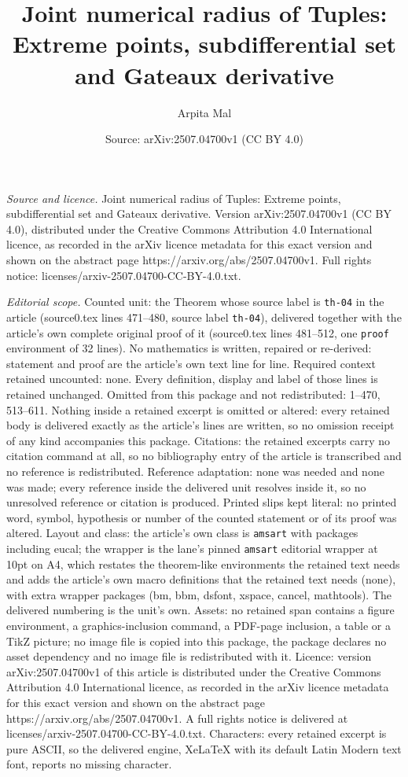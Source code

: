 \documentclass[10pt,a4paper]{amsart}
\title[Joint numerical radius of Tuples: Extreme points, subdiffere]{Joint numerical radius of Tuples: Extreme points, subdifferential set and Gateaux derivative}
\author{Arpita Mal}
\date{Source: arXiv:2507.04700v1 (CC BY 4.0)}
\begin{document}
\maketitle

\noindent\emph{Source and licence.} Joint numerical radius of Tuples: Extreme points, subdifferential set and Gateaux derivative. Version arXiv:2507.04700v1 (CC BY 4.0), distributed under the Creative Commons Attribution 4.0 International licence, as recorded in the arXiv licence metadata for this exact version and shown on the abstract page https://arxiv.org/abs/2507.04700v1. Full rights notice: licenses/arxiv-2507.04700-CC-BY-4.0.txt.\par\smallskip

\noindent\textit{Editorial scope.} Counted unit: the Theorem whose source label is \texttt{th-04} in the article (source0.tex lines 471--480, source label \texttt{th-04}), delivered together with the article's own complete original proof of it (source0.tex lines 481--512, one \texttt{proof} environment of 32 lines). No mathematics is written, repaired or re-derived: statement and proof are the article's own text line for line. Required context retained uncounted: none. Every definition, display and label of those lines is retained unchanged. Omitted from this package and not redistributed: 1--470, 513--611. Nothing inside a retained excerpt is omitted or altered: every retained body is delivered exactly as the article's lines are written, so no omission receipt of any kind accompanies this package. Citations: the retained excerpts carry no citation command at all, so no bibliography entry of the article is transcribed and no reference is redistributed. Reference adaptation: none was needed and none was made; every reference inside the delivered unit resolves inside it, so no unresolved reference or citation is produced. Printed slips kept literal: no printed word, symbol, hypothesis or number of the counted statement or of its proof was altered. Layout and class: the article's own class is \texttt{amsart} with packages including eucal; the wrapper is the lane's pinned \texttt{amsart} editorial wrapper at 10pt on A4, which restates the theorem-like environments the retained text needs and adds the article's own macro definitions that the retained text needs (none), with extra wrapper packages (bm, bbm, dsfont, xspace, cancel, mathtools). The delivered numbering is the unit's own. Assets: no retained span contains a figure environment, a graphics-inclusion command, a PDF-page inclusion, a table or a TikZ picture; no image file is copied into this package, the package declares no asset dependency and no image file is redistributed with it. Licence: version arXiv:2507.04700v1 of this article is distributed under the Creative Commons Attribution 4.0 International licence, as recorded in the arXiv licence metadata for this exact version and shown on the abstract page https://arxiv.org/abs/2507.04700v1. A full rights notice is delivered at licenses/arxiv-2507.04700-CC-BY-4.0.txt. Characters: every retained excerpt is pure ASCII, so the delivered engine, XeLaTeX with its default Latin Modern text font, reports no missing character.
\end{document}
